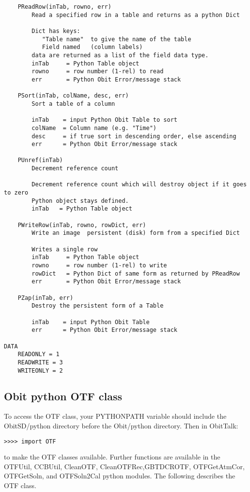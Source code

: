 \documentclass[11pt]{report}
\begin{document}
\begin{verbatim}
    PReadRow(inTab, rowno, err)
        Read a specified row in a table and returns as a python Dict
        
        Dict has keys:
           "Table name"  to give the name of the table
           Field named   (column labels)
        data are returned as a list of the field data type.
        inTab     = Python Table object
        rowno     = row number (1-rel) to read
        err       = Python Obit Error/message stack
    
    PSort(inTab, colName, desc, err)
        Sort a table of a column
        
        inTab    = input Python Obit Table to sort
        colName  = Column name (e.g. "Time")
        desc     = if true sort in descending order, else ascending
        err      = Python Obit Error/message stack
    
    PUnref(inTab)
        Decrement reference count
        
        Decrement reference count which will destroy object if it goes to zero
        Python object stays defined.
        inTab   = Python Table object
    
    PWriteRow(inTab, rowno, rowDict, err)
        Write an image  persistent (disk) form from a specified Dict
        
        Writes a single row
        inTab     = Python Table object
        rowno     = row number (1-rel) to write
        rowDict   = Python Dict of same form as returned by PReadRow
        err       = Python Obit Error/message stack
    
    PZap(inTab, err)
        Destroy the persistent form of a Table
        
        inTab    = input Python Obit Table
        err      = Python Obit Error/message stack

DATA
    READONLY = 1
    READWRITE = 3
    WRITEONLY = 2

\end{verbatim}

\subsection{Obit python OTF class}
To access the OTF class, your PYTHONPATH variable should include the
ObitSD/python directory before the Obit/python directory.
Then in ObitTalk:
\begin{verbatim}
>>>> import OTF
\end{verbatim}
to make the OTF classes available.
Further functions are available in the OTFUtil, CCBUtil, CleanOTF,
CleanOTFRec,GBTDCROTF, OTFGetAtmCor, OTFGetSoln, and OTFSoln2Cal
python modules.
The following describes the OTF class.
\end{document}
